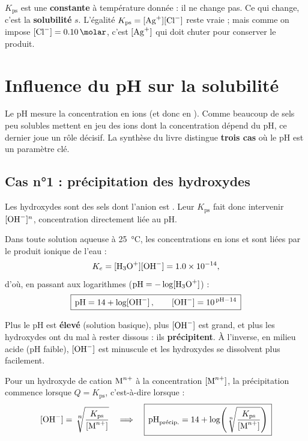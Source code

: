 \documentclass[11pt,a4paper]{article}
\newcommand{\Kps}{K_{\mathrm{ps}}}
\begin{document}
\begin{attention}[l'ion commun ne change pas $\Kps$ !]
$\Kps$ est une \textbf{constante} à température donnée : il ne change pas. Ce qui change, c'est la
\textbf{solubilité} $s$. L'égalité $\Kps=[\ce{Ag+}][\ce{Cl-}]$ reste vraie ; mais comme on impose
$[\ce{Cl-}]=\qty{0{,}10}{\molar}$, c'est $[\ce{Ag+}]$ qui doit chuter pour conserver le produit.
\end{attention}

\section{Influence du pH sur la solubilité}
Le pH mesure la concentration en ions  (et donc en ). Comme beaucoup de sels peu
solubles mettent en jeu des ions dont la concentration dépend du pH, ce dernier joue un rôle décisif.
La synthèse du livre distingue \textbf{trois cas} où le pH est un paramètre clé.

\subsection{Cas n°1 : précipitation des hydroxydes}

Les hydroxydes  sont des sels dont l'anion est . Leur $\Kps$ fait donc
intervenir $[\ce{OH-}]^{n}$, concentration directement liée au pH.

\begin{theoreme}
Dans toute solution aqueuse à \qty{25}{\degreeCelsius}, les concentrations en ions  et
 sont liées par le produit ionique de l'eau :
\[ K_{e} = [\ce{H3O+}][\ce{OH-}] = \num{1{,}0e-14}, \]
d'où, en passant aux logarithmes ($\mathrm{pH}=-\log[\ce{H3O+}]$) :
\[ \boxed{\,\mathrm{pH} = 14 + \log[\ce{OH-}]\,,\qquad [\ce{OH-}] = 10^{\,\mathrm{pH}-14}\,} \]
\end{theoreme}

\noindent Plus le pH est \textbf{élevé} (solution basique), plus $[\ce{OH-}]$ est grand, et plus les
hydroxydes ont du mal à rester dissous : ils \textbf{précipitent}. À l'inverse, en milieu acide (pH
faible), $[\ce{OH-}]$ est minuscule et les hydroxydes se dissolvent plus facilement.

\begin{formule}
Pour un hydroxyde  de cation $\ce{M^{n+}}$ à la concentration $[\ce{M^{n+}}]$, la
précipitation commence lorsque $Q=\Kps$, c'est-à-dire lorsque :
\[ [\ce{OH-}] = \sqrt[\leftroot{-2}\uproot{2}\scriptstyle n]{\dfrac{\Kps}{[\ce{M^{n+}}]}}
   \quad\Longrightarrow\quad
   \boxed{\,\mathrm{pH}_{\text{précip.}} = 14 + \log\!\left(\sqrt[n]{\dfrac{\Kps}{[\ce{M^{n+}}]}}\right)\,} \]
\end{formule}
\end{document}
